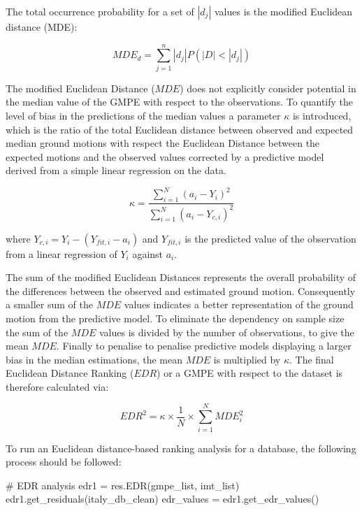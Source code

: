 The total occurrence probability for a set of $|d_j|$ values is the modified Euclidean distance (MDE):

\begin{equation}
MDE_d = \sum_{j=1}^{n} |d_j| P \left( {|D| < |d_j|} \right)
\end{equation}

The modified Euclidean Distance ($MDE$) does not explicitly consider potential in the median value of the GMPE with respect to the observations.  To quantify the level of bias in the predictions of the median values a parameter $\kappa$ is introduced, which is the ratio of the total Euclidean distance between observed and expected median ground motions with respect the Euclidean Distance between the expected motions and the observed values corrected by a predictive model derived from a simple linear regression on the data. 

\begin{equation}
\kappa = \frac{\sum\limits_{i=1}^{N} \left( {a_i - Y_i} \right)^2}{\sum \limits_{i=1}^{N} \left( {a_i - Y_{c,i}} \right)^2}
\end{equation}

\noindent where $Y_{c,i} = Y_i - \left( {Y_{fit,i} - a_i} \right)$ and $Y_{fit,i}$ is the predicted value of the observation from a linear regression of $Y_i$ against $a_i$.

The sum of the modified Euclidean Distances represents the overall probability of the differences between the observed and estimated ground motion. Consequently a smaller sum of the $MDE$ values indicates a better representation of the ground motion from the predictive model. To eliminate the dependency on sample size the sum of the $MDE$ values is divided by the number of observations, to give the mean $MDE$. Finally to penalise to penalise predictive models displaying a larger bias in the median estimations, the mean $MDE$ is multiplied by $\kappa$. The final Euclidean Distance Ranking ($EDR$) or a GMPE with respect to the dataset is therefore calculated via:

\begin{equation}
EDR^2 = \kappa \times \frac{1}{N} \times \sum_{i=1}^{N} MDE_i^2
\end{equation}

To run an Euclidean distance-based ranking analysis for a database, the following process should be followed:

\begin{python}[frame=single]
# EDR analysis
edr1 = res.EDR(gmpe_list, imt_list)
edr1.get_residuals(italy_db_clean)
edr_values = edr1.get_edr_values()
\end{python}

